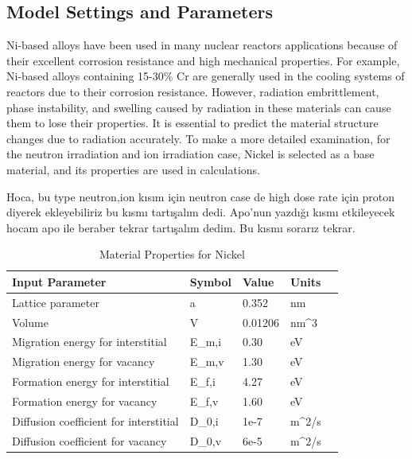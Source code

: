 \documentclass[a4paper]{article}
\begin{document}
\subsection{Model Settings and Parameters} \hspace{10pt}
    Ni-based alloys have been used in many nuclear reactors applications because of their excellent corrosion resistance and high mechanical properties. For example, Ni-based alloys containing 15-30\% Cr are generally used in the cooling systems of reactors due to their corrosion resistance. However, radiation embrittlement, phase instability, and swelling caused by radiation in these materials can cause them to lose their properties. It is essential to predict the material structure changes due to radiation accurately.
    To make a more detailed examination, for the neutron irradiation and ion irradiation case, Nickel is selected as a base material, and its properties are used in calculations.


\color{red} Hoca, bu type neutron,ion kısım için neutron case de high dose rate için proton diyerek ekleyebiliriz bu kısmı tartışalım dedi. Apo'nun yazdığı kısmı etkileyecek hocam apo ile beraber tekrar tartışalım dedim. Bu kısmı sorarız tekrar.

\begin{table}[h!]
  \centering
  \caption{Material Properties for Nickel\cite{walgraef1996}}
  \label{table:Ni_material_properties}
  \begin{tabular}{ ||p{5.5cm}|p{2cm}|p{2cm}||p{2cm}|p{2cm}||  }
     \hline
     Input Parameter & Symbol & Value & Units\\
     \hline\hline

    Lattice parameter & a  & 0.352  & nm\\
    Volume & V  & 0.01206 & nm^3 \\
    Migration energy for interstitial & E_{m,i}  & 0.30 & eV \\
    Migration energy for vacancy & E_{m,v}  & 1.30 & eV \\
    Formation energy for interstitial & E_{f,i}  & 4.27 & eV \\
    Formation energy for vacancy & E_{f,v}  & 1.60 & eV  \\
    Diffusion coefficient for interstitial & D_{0,i}  & 1e-7 & m^2/s  \\
    Diffusion coefficient for vacancy & D_{0,v}  & 6e-5 & m^2/s  \\

     \hline
  \end{tabular}
\end{table}
\end{document}

